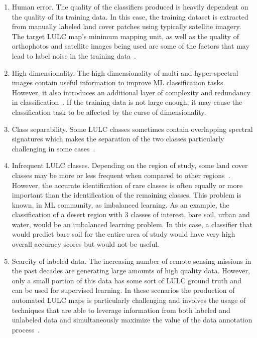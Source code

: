 \begin{enumerate}
    \item Human error. The quality of the classifiers produced is heavily
        dependent on the quality of its training data. In this case, the
        training dataset is extracted from manually labeled land cover patches
        using typically satellite imagery. The target LULC map's minimum
        mapping unit, as well as the quality of orthophotos and satellite
        images being used are some of the factors that may lead to label noise
        in the training data~\cite{Pelletier2017}.
    \item High dimensionality. The high dimensionality of multi and
        hyper-spectral images contain useful information to improve ML
        classification tasks. However, it also introduces an additional layer
        of complexity and redundancy in classification~\cite{Stromann2020}. If
        the training data is not large enough, it may cause the classification
        task to be affected by the curse of dimensionality.
    \item Class separability. Some LULC classes sometimes contain overlapping
        spectral signatures which makes the separation of the two classes
        particularly challenging in some cases~\cite{Alonso-Sarria2019}.
    \item Infrequent LULC classes. Depending on the region of study, some land
        cover classes may be more or less frequent when compared to other
        regions~\cite{Feng2018}. However, the accurate identification of rare classes
        is often equally or more important than the identification of the
        remaining classes. This problem is known, in ML community, as
        imbalanced learning. As an example, the classification of a desert
        region with 3 classes of interest, bare soil, urban and water, would be
        an imbalanced learning problem. In this case, a classifier that would
        predict bare soil for the entire area of study would have very high
        overall accuracy scores but would not be useful.
    \item Scarcity of labeled data. The increasing number of remote sensing
        missions in the past decades are generating large amounts of high
        quality data. However, only a small portion of this data has some sort
        of LULC ground truth and can be used for supervised learning. In these
        scenarios the production of automated LULC maps is particularly
        challenging and involves the usage of techniques that are able to
        leverage information from both labeled and unlabeled data and
        simultaneously maximize the value of the data annotation
        process~\cite{Simeoni2020}.
\end{enumerate}

